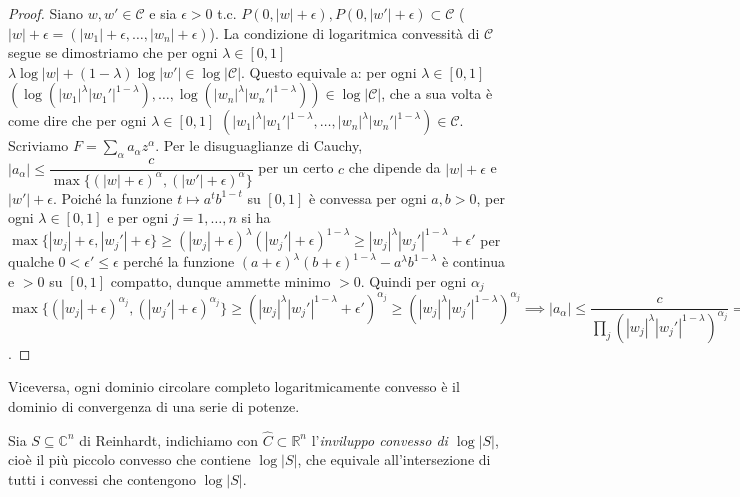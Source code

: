 \begin{proof}
  Siano $w, w' \in \mathcal{C}$ e sia $\epsilon>0$ t.c. $P(0, |w|+\epsilon), P(0, |w'|+\epsilon) \subset \mathcal{C}$ ($|w|+\epsilon=(|w_1|+\epsilon, \dots, |w_n|+\epsilon)$). La condizione di logaritmica convessità di $\mathcal{C}$ segue se dimostriamo che per ogni $\lambda \in [0,1]$ $\lambda\log{|w|}+(1-\lambda)\log{|w'|} \in \log{|\mathcal{C}|}$.
  Questo equivale a: per ogni $\lambda \in [0,1]$ $(\log{(|w_1|^{\lambda}|w_1'|^{1-\lambda})},\dots,\log{(|w_n|^{\lambda}|w_n'|^{1-\lambda})}) \in \log{|\mathcal{C}|}$, che a sua volta è come dire che per ogni $\lambda \in [0,1]$ $(|w_1|^{\lambda}|w_1'|^{1-\lambda},\dots,|w_n|^{\lambda}|w_n'|^{1-\lambda}) \in \mathcal{C}$.
  Scriviamo $\displaystyle F=\sum_{\alpha} a_{\alpha}z^{\alpha}$. Per le disuguaglianze di Cauchy, $|a_{\alpha}| \le \dfrac{c}{\max\{(|w|+\epsilon)^{\alpha},(|w'|+\epsilon)^{\alpha}\}}$ per un certo $c$ che dipende da $|w|+\epsilon$ e $|w'|+\epsilon$.
  Poiché la funzione $t \longmapsto a^tb^{1-t}$ su $[0,1]$ è convessa per ogni $a, b>0$, per ogni $\lambda \in [0,1]$ e per ogni $j=1,\dots,n$ si ha $\max\{|w_j|+\epsilon, |w_j'|+\epsilon\} \ge (|w_j|+\epsilon)^{\lambda}(|w_j'|+\epsilon)^{1-\lambda} \ge |w_j|^{\lambda}|w_j'|^{1-\lambda}+\epsilon'$ per qualche $0<\epsilon'\le\epsilon$ perché la funzione $(a+\epsilon)^{\lambda}(b+\epsilon)^{1-\lambda}-a^{\lambda}b^{1-\lambda}$ è continua e $>0$ su $[0,1]$ compatto, dunque ammette minimo $>0$.
  Quindi per ogni $\alpha_j$ $\max\{(|w_j|+\epsilon)^{\alpha_j},(|w_j'|+\epsilon)^{\alpha_j}\} \ge (|w_j|^{\lambda}|w_j'|^{1-\lambda}+\epsilon')^{\alpha_j} \ge (|w_j|^{\lambda}|w_j'|^{1-\lambda})^{\alpha_j} \implies |a_{\alpha}| \le \dfrac{c}{\prod_j (|w_j|^{\lambda}|w_j'|^{1-\lambda})^{\alpha_j}} \implies (|w_1|^{\lambda}|w_1'|^{1-\lambda}, \dots, |w_n|^{\lambda}|w_n'|^{1-\lambda}) \in \mathcal{C}$.
\end{proof}

\begin{ftt}
  Viceversa, ogni dominio circolare completo logaritmicamente convesso è il dominio di convergenza di una serie di potenze.
\end{ftt}

\begin{defn}
  Sia $S \subseteq \mathbb{C}^n$ di Reinhardt, indichiamo con $\hat{C} \subset \mathbb{R}^n$ l'\textit{inviluppo convesso di $\log{|S|}$}, cioè il più piccolo convesso che contiene $\log{|S|}$, che equivale all'intersezione di tutti i convessi che contengono $\log{|S|}$.
\end{defn}

